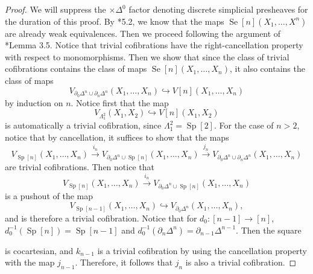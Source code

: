 \documentclass{amsart}
\numberwithin{equation}{section}
\theoremstyle{plain}   %
\theoremstyle{remark}
\theoremstyle{plain}
\begin{document}
\begin{proof}
	We will suppress the \(\times \Delta^0\) factor denoting discrete simplicial presheaves for the duration of this proof.  By \cite{rezk-theta-n-spaces}*{5.2}, we know that the maps \(\operatorname{Se}[n](X_1,\dots,X^n)\) are already weak equivalences.  Then we proceed following the argument of \cite{jtsegal}*{Lemma 3.5}.  Notice that trivial cofibrations have the right-cancellation property with respect to monomorphisms.  Then we show that since the class of trivial cofibrations contains the class of maps \(\operatorname{Se}[n](X_1,\dots,X_n)\), it also contains the class of maps 
	\[V_{\partial_0 \Delta^n \cup \partial_n \Delta^n}(X_1,\dots,X_n)\hookrightarrow V[n](X_1,\dots,X_n)\] by induction on \(n\).  Notice first that the map
	\[V_{\Lambda^2_1}(X_1,X_2)\hookrightarrow V[n](X_1,X_2)\]
	is automatically a trivial cofibration, since \(\Lambda^2_1=\operatorname{Sp}[2]\).
	For the case of \(n>2\), notice that by cancellation, it suffices to show that the maps
	\[V_{\operatorname{Sp}[n]}(X_1,\dots, X_n) \xrightarrow{i_n} V_{\partial_0\Delta^n \cup \operatorname{Sp}[n]}(X_1,\dots, X_n) \xrightarrow{j_n} V_{\partial_0 \Delta^n \cup \partial_n \Delta^n}(X_1,\dots,X_n)\]
	are trivial cofibrations.
	Then notice that 
	\[V_{\operatorname{Sp}[n]}(X_1,\dots,X_n) \xrightarrow{i_n} V_{\partial_0 \Delta^n\cup \operatorname{Sp}[n]}(X_1,\dots,X_n)\]
	is a pushout of the map 
	\[V_{\operatorname{Sp}[n-1]}(X_1,\dots,X_n) \hookrightarrow V_{\partial_0 \Delta^n}(X_1,\dots,X_n),\]
	and is therefore a trivial cofibration.  
	Notice that for \(d_0: [n-1] \to [n]\), \(d_0^{-1}(\operatorname{Sp}[n]) = \operatorname{Sp}[n-1]\) and \(d_0^{-1}(\partial_n\Delta^n) = \partial_{n-1}\Delta^{n-1}\).  Then the square
	\begin{center}
	\end{center}
	is cocartesian, and \(k_{n-1}\) is a trivial cofibration by using the cancellation property with the map \(j_{n-1}\).
	Therefore, it follows that \(j_n\) is also a trivial cofibration. 


\end{proof}
\end{document}
